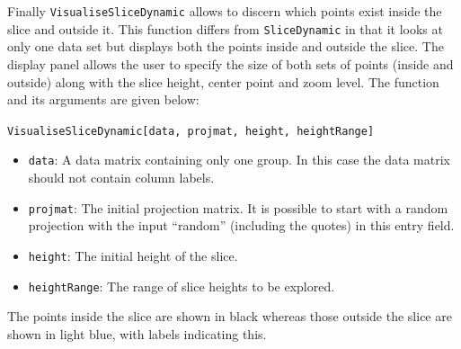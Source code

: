 \documentclass[]{interact}
\theoremstyle{plain}%
\theoremstyle{definition}
\theoremstyle{remark}
\providecommand{\tightlist}{%
  \setlength{\itemsep}{0pt}\setlength{\parskip}{0pt}}
\def\tightlist{}
\begin{document}
Finally \texttt{VisualiseSliceDynamic} allows to discern which points
exist inside the slice and outside it. This function differs from
\texttt{SliceDynamic} in that it looks at only one data set but displays
both the points inside and outside the slice. The display panel allows
the user to specify the size of both sets of points (inside and outside)
along with the slice height, center point and zoom level. The function
and its arguments are given below:

\texttt{VisualiseSliceDynamic{[}data,\ projmat,\ height,\ heightRange{]}}

\begin{itemize}
\tightlist
\item
  \texttt{data}: A data matrix containing only one group. In this case
  the data matrix should not contain column labels.
\item
  \texttt{projmat}: The initial projection matrix. It is possible to
  start with a random projection with the input ``random'' (including
  the quotes) in this entry field.
\item
  \texttt{height}: The initial height of the slice.
\item
  \texttt{heightRange}: The range of slice heights to be explored.
\end{itemize}

The points inside the slice are shown in black whereas those outside the
slice are shown in light blue, with labels indicating this.



\end{document}
